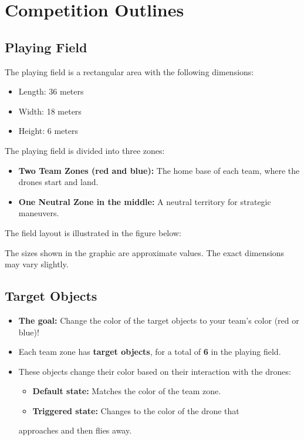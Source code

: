 \section{Competition Outlines}

\subsection{Playing Field}

The playing field is a rectangular area with the following dimensions:

\begin{itemize}
	\item Length: 36 meters
	\item Width: 18 meters
	\item Height: 6 meters
\end{itemize}


The playing field is divided into three zones:
\begin{itemize}
	\item \textbf{Two Team Zones (red and blue):} The home base of each team, where the drones start and land.
	\item \textbf{One Neutral Zone in the middle:} A neutral territory for strategic maneuvers.
\end{itemize}

The field layout is illustrated in the figure below:



The sizes shown in the graphic are approximate values. The exact dimensions may vary slightly.

\subsection{Target Objects}

\begin{itemize}
	\item \textbf{The goal:} Change the color of the target objects to your team's color (red or blue)!
	\item Each team zone has \textbf{target objects}, for a total of \textbf{6} in the playing field.
	\item These objects change their color based on their interaction with the drones:
	      \begin{itemize}
		      \item \textbf{Default state:} Matches the color of the team zone.
		      \item \textbf{Triggered state:} Changes to the color of the drone that
	      \end{itemize}
	      approaches and then flies away.
\end{itemize}



